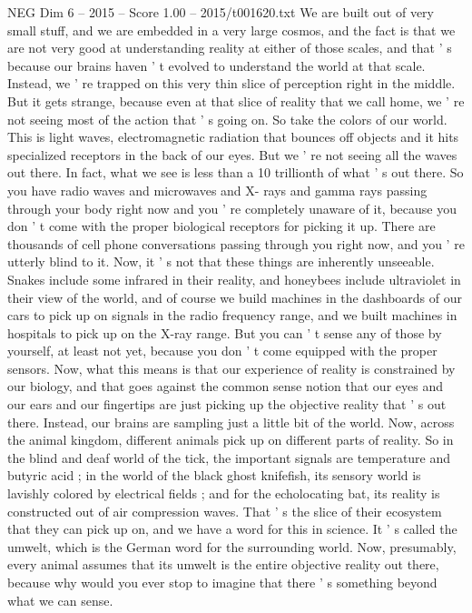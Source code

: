 \begin{textsample}{NEG Dim 6 – 2015 – Score 1.00 – 2015/t001620.txt}  \label{ex:f6_neg_028}
We are built out of very small stuff, and we are embedded in a very large cosmos, and the fact is that we are not very good at understanding reality at either of those scales, and that ' s because our brains haven ' t evolved to understand the world at that scale.
Instead, we ' re trapped on this very thin slice of perception right in the middle.
But it gets strange, because even at that slice of reality that we call home, we ' re not seeing most of the action that ' s going on.
So take the colors of our world.
This is light waves, electromagnetic radiation that bounces off objects and it hits specialized receptors in the back of our eyes.
But we ' re not seeing all the waves out there.
In fact, what we see is less than a 10 trillionth of what ' s out there.
So you have radio waves and microwaves and X- rays and gamma rays passing through your body right now and you ' re completely unaware of it, because you don ' t come with the proper biological receptors for picking it up.
There are thousands of cell phone conversations passing through you right now, and you ' re utterly blind to it.
Now, it ' s not that these things are inherently unseeable.
Snakes include some infrared in their reality, and honeybees include ultraviolet in their view of the world, and of course we build machines in the dashboards of our cars to pick up on signals in the radio frequency range, and we built machines in hospitals to pick up on the X-ray range.
But you can ' t sense any of those by yourself, at least not yet, because you don ' t come equipped with the proper sensors.
Now, what this means is that our experience of reality is constrained by our biology, and that goes against the common sense notion that our eyes and our ears and our fingertips are just picking up the objective reality that ' s out there.
Instead, our brains are sampling just a little bit of the world.
Now, across the animal kingdom, different animals pick up on different parts of reality.
So in the blind and deaf world of the tick, the important signals are temperature and butyric acid ; in the world of the black ghost knifefish, its sensory world is lavishly colored by electrical fields ; and for the echolocating bat, its reality is constructed out of air compression waves.
That ' s the slice of their ecosystem that they can pick up on, and we have a word for this in science.
It ' s called the umwelt, which is the German word for the surrounding world.
Now, presumably, every animal assumes that its umwelt is the entire objective reality out there, because why would you ever stop to imagine that there ' s something beyond what we can sense.

\end{textsample}
